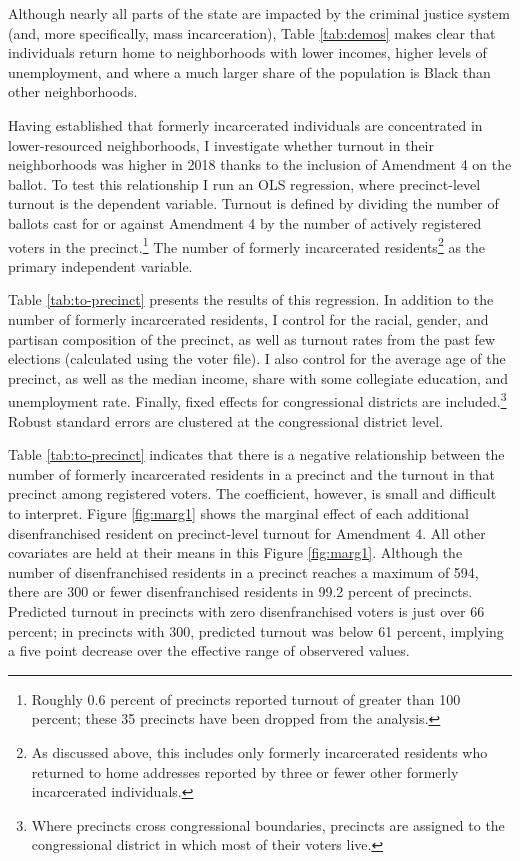 \documentclass[
  12pt,
]{article}
\begin{document}


Although nearly all parts of the state are impacted by the criminal justice system (and, more specifically, mass incarceration), Table \ref{tab:demos} makes clear that individuals return home to neighborhoods with lower incomes, higher levels of unemployment, and where a much larger share of the population is Black than other neighborhoods.

Having established that formerly incarcerated individuals are concentrated in lower-resourced neighborhoods, I investigate whether turnout in their neighborhoods was higher in 2018 thanks to the inclusion of Amendment 4 on the ballot. To test this relationship I run an OLS regression, where precinct-level turnout is the dependent variable. Turnout is defined by dividing the number of ballots cast for or against Amendment 4 by the number of actively registered voters in the precinct.\footnote{Roughly 0.6 percent of precincts reported turnout of greater than 100 percent; these 35 precincts have been dropped from the analysis.} The number of formerly incarcerated residents\footnote{As discussed above, this includes only formerly incarcerated residents who returned to home addresses reported by three or fewer other formerly incarcerated individuals.} as the primary independent variable.

Table \ref{tab:to-precinct} presents the results of this regression. In addition to the number of formerly incarcerated residents, I control for the racial, gender, and partisan composition of the precinct, as well as turnout rates from the past few elections (calculated using the voter file). I also control for the average age of the precinct, as well as the median income, share with some collegiate education, and unemployment rate. Finally, fixed effects for congressional districts are included.\footnote{Where precincts cross congressional boundaries, precincts are assigned to the congressional district in which most of their voters live.} Robust standard errors are clustered at the congressional district level.

\begin{singlespace}


\end{singlespace}

Table \ref{tab:to-precinct} indicates that there is a negative relationship between the number of formerly incarcerated residents in a precinct and the turnout in that precinct among registered voters. The coefficient, however, is small and difficult to interpret. Figure \ref{fig:marg1} shows the marginal effect of each additional disenfranchised resident on precinct-level turnout for Amendment 4. All other covariates are held at their means in this Figure \ref{fig:marg1}. Although the number of disenfranchised residents in a precinct reaches a maximum of 594, there are 300 or fewer disenfranchised residents in 99.2 percent of precincts. Predicted turnout in precincts with zero disenfranchised voters is just over 66 percent; in precincts with 300, predicted turnout was below 61 percent, implying a five point decrease over the effective range of observered values.
\end{document}
